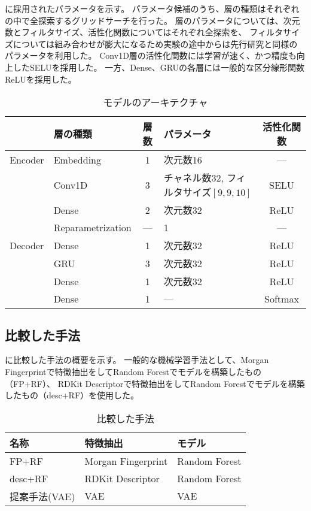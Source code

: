 に採用されたパラメータを示す。
パラメータ候補のうち、層の種類はそれぞれの中で全探索するグリッドサーチを行った。
層のパラメータについては、次元数とフィルタサイズ、活性化関数についてはそれぞれ全探索を、
フィルタサイズについては組み合わせが膨大になるため実験の途中からは先行研究\cite{Gomez-Bombarelli2016}と同様の
パラメータを利用した。
Conv1D層の活性化関数には学習が速く、かつ精度も向上したSELU\cite{selu}を採用した。
一方、Dense、GRUの各層には一般的な区分線形関数ReLUを採用した。
\begin{table}[tbp]
    \centering
    \caption{モデルのアーキテクチャ} \label{tb:vae_model_detail}
    \begin{tabular}{llclc}\hline
     & 層の種類 & 層数 & パラメータ & 活性化関数 \\\hline
     Encoder & Embedding & 1 & 次元数16 &--- \\
      & Conv1D & 3 & チャネル数32, フィルタサイズ$[9, 9, 10]$ & SELU \\
     & Dense & 2 & 次元数32 & ReLU \\ 
     & Reparametrization & --- &  1 & --- \\\hline
    Decoder & Dense & 1 & 次元数32 & ReLU \\
     & GRU & 3 & 次元数32 & ReLU \\
     & Dense & 1 & 次元数32 & ReLU \\
     & Dense & 1 & ---  & Softmax \\\hline
    \end{tabular}
\end{table}

\subsection{比較した手法}

に比較した手法の概要を示す。
一般的な機械学習手法として、Morgan Fingerprintで特徴抽出をしてRandom Forest\cite{randomforest}でモデルを構築したもの（FP+RF）、
RDKit Descriptorで特徴抽出をしてRandom Forestでモデルを構築したもの（desc+RF）を使用した。
\begin{table}[tbp]
    \centering
    \caption{比較した手法} \label{tb:vae_method}
    \begin{tabular}{lll}\hline
    名称& 特徴抽出 & モデル \\\hline
    FP+RF & Morgan Fingerprint & Random Forest \\
    desc+RF & RDKit Descriptor & Random Forest \\
    提案手法(VAE) & VAE  & VAE \\\hline   
    \end{tabular}
\end{table}

